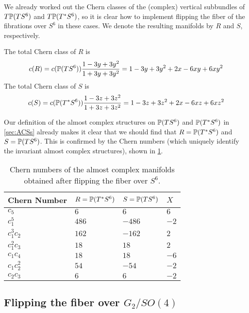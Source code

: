 We already worked out the Chern classes of the (complex) vertical subbundles of $T\P(TS^6)$ and $T\P(T^*S^6)$, so it is clear how to implement flipping the fiber of the fibrations over $S^6$ in these cases. We denote the resulting manifolds by $R$ and $S$, respectively.

\begin{prop}
	The total Chern class of $R$ is 
	\begin{equation*}
		c(R)=c(\P(TS^6))\frac{1-3y+3y^2}{1+3y+3y^2}=1-3y+3y^2+2x-6xy+6xy^2
	\end{equation*}
	The total Chern class of $S$ is
	\begin{equation*}
		c(S)=c(\P(T^*S^6))\frac{1-3z+3z^2}{1+3z+3z^2}=1-3z+3z^2+2x-6xz+6xz^2
	\end{equation*}
	\proofclear
\end{prop}

Our definition of the almost complex structures on $\P(TS^6)$ and $\P(T^*S^6)$ in \cref{sec:ACSs} already makes it clear that we should find that $R=\P(T^*S^6)$ and $S=\P(TS^6)$. This is confirmed by the Chern numbers (which uniquely identify the invariant almost complex structures), shown in \cref{tab:QflipS6numbers}. 

\begin{table}[ht!]\centering
	\begin{tabular}{llll} \toprule
		Chern Number& $R=\P(T^*S^6)$& $S=\P(TS^6)$	& $X$\\ \midrule
		$c_5$ 		& $6$ 			& $6$ 			& $6$\\
		$c_1^5$ 	& $486$			& $-486$		& $-2$\\
		$c_1^3c_2$	& $162$ 		& $-162$		& $2$\\
		$c_1^2c_3$	& $18$ 			& $18$ 			& $2$\\
		$c_1c_4$	& $18$ 			& $18$ 			& $-6$\\
		$c_1c_2^2$	& $54$ 			& $-54$ 		& $-2$\\
		$c_2c_3$	& $6$ 			& $6$			& $-2$\\ \bottomrule
	\end{tabular}
	\caption{Chern numbers of the almost complex manifolds obtained after flipping the fiber over $S^6$.}\label{tab:QflipS6numbers}
\end{table}

\subsection{Flipping the fiber over \texorpdfstring{$G_2/SO(4)$}{G2 over SO(4)}}

